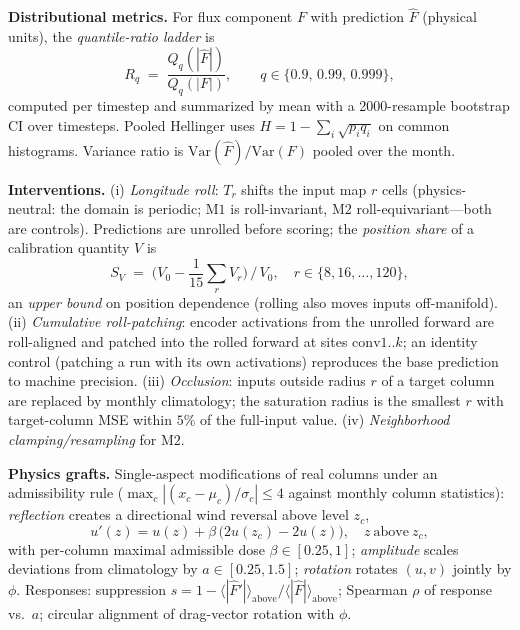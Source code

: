 \documentclass[10pt,twocolumn]{article}
\newcommand{\Mone}{\mathrm{M1}}
\newcommand{\Mtwo}{\mathrm{M2}}
\begin{document}
\textbf{Distributional metrics.} For flux component $F$ with prediction $\hat F$ (physical units), the \emph{quantile-ratio ladder} is
\begin{equation}\label{eq:ladder}
R_q \;=\; \frac{Q_q(|\hat F|)}{Q_q(|F|)},\qquad q\in\{0.9,\,0.99,\,0.999\},
\end{equation}
computed per timestep and summarized by mean with a 2000-resample bootstrap CI over timesteps. Pooled Hellinger uses $H = 1-\sum_i\sqrt{p_i q_i}$ on common histograms. Variance ratio is $\mathrm{Var}(\hat F)/\mathrm{Var}(F)$ pooled over the month.

\textbf{Interventions.} (i) \emph{Longitude roll}: $T_r$ shifts the input map $r$ cells (physics-neutral: the domain is periodic; $\Mone$ is roll-invariant, $\Mtwo$ roll-equivariant---both are controls). Predictions are unrolled before scoring; the \emph{position share} of a calibration quantity $V$ is
\begin{equation}\label{eq:share}
S_V \;=\; \big(V_{0} - \textstyle\frac{1}{15}\sum_{r} V_{r}\big)\,/\,V_{0},\quad r\in\{8,16,\dots,120\},
\end{equation}
an \emph{upper bound} on position dependence (rolling also moves inputs off-manifold). (ii) \emph{Cumulative roll-patching}: encoder activations from the unrolled forward are roll-aligned and patched into the rolled forward at sites $\mathrm{conv}1..k$; an identity control (patching a run with its own activations) reproduces the base prediction to machine precision. (iii) \emph{Occlusion}: inputs outside radius $r$ of a target column are replaced by monthly climatology; the saturation radius is the smallest $r$ with target-column MSE within $5\%$ of the full-input value. (iv) \emph{Neighborhood clamping/resampling} for $\Mtwo$.

\textbf{Physics grafts.} Single-aspect modifications of real columns under an admissibility rule ($\max_c |(x_c-\mu_c)/\sigma_c|\le 4$ against monthly column statistics): \emph{reflection} creates a directional wind reversal above level $z_c$,
\begin{equation}\label{eq:graft}
u'(z) = u(z) + \beta\,\big(2u(z_c)-2u(z)\big),\quad z\ \text{above}\ z_c,
\end{equation}
with per-column maximal admissible dose $\beta\in[0.25,1]$; \emph{amplitude} scales deviations from climatology by $a\in[0.25,1.5]$; \emph{rotation} rotates $(u,v)$ jointly by $\phi$. Responses: suppression $s = 1 - \langle|\hat F'|\rangle_{\text{above}}/\langle|\hat F|\rangle_{\text{above}}$; Spearman $\rho$ of response vs.\ $a$; circular alignment of drag-vector rotation with $\phi$.
\end{document}
